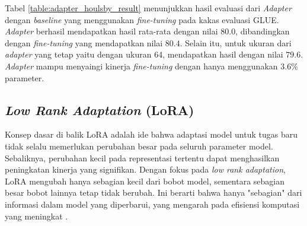 \begin{table}[h]
    \vspace{0.25cm}
    \centering
    \caption{Hasil \textit{Adapter} konfigurasi \citeauthor{adapter_houlsby} pada GLUE \parencite{adapter_houlsby}}
    \label{table:adapter_houlsby_result}
\end{table}

Tabel \ref{table:adapter_houlsby_result} menunjukkan hasil evaluasi dari \textit{Adapter} dengan \textit{baseline} yang menggunakan \textit{fine-tuning} pada kakas evaluasi GLUE. \textit{Adapter} berhasil mendapatkan hasil rata-rata dengan nilai $80.0$, dibandingkan dengan \textit{fine-tuning} yang mendapatkan nilai $80.4$. Selain itu, untuk ukuran dari \textit{adapter} yang tetap yaitu dengan ukuran 64, mendapatkan hasil dengan nilai $79.6$. \textit{Adapter} mampu menyaingi kinerja \textit{fine-tuning} dengan hanya menggunakan $3.6\%$ parameter.

\subsection{\textit{Low Rank Adaptation} (LoRA)}

Konsep dasar di balik LoRA adalah ide bahwa adaptasi model untuk tugas baru tidak selalu memerlukan perubahan besar pada seluruh parameter model. Sebaliknya, perubahan kecil pada representasi tertentu dapat menghasilkan peningkatan kinerja yang signifikan. Dengan fokus pada \textit{low rank adaptation}, LoRA mengubah hanya sebagian kecil dari bobot model, sementara sebagian besar bobot lainnya tetap tidak berubah. Ini berarti bahwa hanya "sebagian" dari informasi dalam model yang diperbarui, yang mengarah pada efisiensi komputasi yang meningkat \parencite{lora}.

